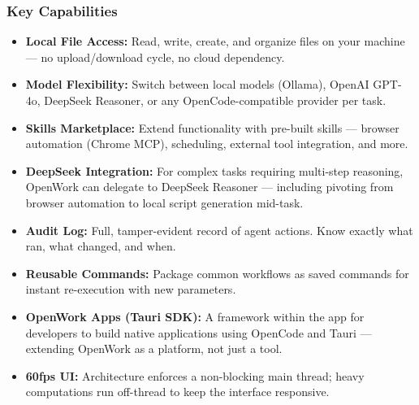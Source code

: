 \begin{frame}[fragile]\frametitle{Key Capabilities}
  \begin{itemize}
    \item \textbf{Local File Access:} Read, write, create, and organize files on your machine — no upload/download cycle, no cloud dependency.
    \item \textbf{Model Flexibility:} Switch between local models (Ollama), OpenAI GPT-4o, DeepSeek Reasoner, or any OpenCode-compatible provider per task.
    \item \textbf{Skills Marketplace:} Extend functionality with pre-built skills — browser automation (Chrome MCP), scheduling, external tool integration, and more.
    \item \textbf{DeepSeek Integration:} For complex tasks requiring multi-step reasoning, OpenWork can delegate to DeepSeek Reasoner — including pivoting from browser automation to local script generation mid-task.
    \item \textbf{Audit Log:} Full, tamper-evident record of agent actions. Know exactly what ran, what changed, and when.
    \item \textbf{Reusable Commands:} Package common workflows as saved commands for instant re-execution with new parameters.
    \item \textbf{OpenWork Apps (Tauri SDK):} A framework within the app for developers to build native applications using OpenCode and Tauri — extending OpenWork as a platform, not just a tool.
    \item \textbf{60fps UI:} Architecture enforces a non-blocking main thread; heavy computations run off-thread to keep the interface responsive.
  \end{itemize}
\end{frame}

